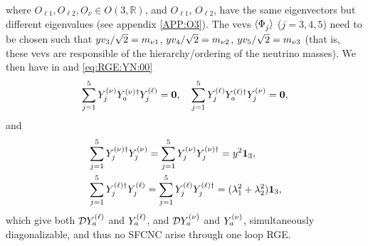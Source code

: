 \documentclass[12pt,a4paper]{article}
\begin{document}
where $O_{\ell 1},O_{\ell 2},O_\nu\in O(3,\mathbb{R})$, and $O_{\ell 1}$, $O_{\ell 2}$, have the same eigenvectors but different eigenvalues (see appendix \ref{APP:O3}).
The vevs $\VEV{\SD{j}}$ ($j=3,4,5$) need to be chosen such that $yv_{3}/\sqrt{2}=m_{\nu 1}$, $yv_{4}/\sqrt{2}=m_{\nu 2}$, $yv_{5}/\sqrt{2}=m_{\nu 3}$ (that is, these vevs are responsible of the hierarchy/ordering of the neutrino masses). We then have in  and \eqref{eq:RGE:YN:00}
\begin{equation}
 \sum_{j=1}^5Y_{j}^{\rm (\nu)}Y_{a}^{\rm (\nu)\dagger}Y_{j}^{\rm (\ell)}=\mathbf{0},\quad \sum_{j=1}^5Y_{j}^{\rm (\ell)}Y_{a}^{\rm (\ell)\dagger}Y_{j}^{\rm (\nu)}=\mathbf{0},
\end{equation}
and
\begin{equation}
\begin{aligned}
 &\sum_{j=1}^5Y_{j}^{\rm (\nu)\dagger}Y_{j}^{\rm (\nu)}=\sum_{j=1}^5Y_{j}^{\rm (\nu)}Y_{j}^{\rm (\nu)\dagger}=y^2\mathbf{1}_3,\\
 &\sum_{j=1}^5Y_{j}^{\rm (\ell)\dagger}Y_{j}^{\rm (\ell)}=\sum_{j=1}^5Y_{j}^{\rm (\ell)}Y_{j}^{\rm (\ell)\dagger}=(\lambda_1^2+\lambda_2^2)\mathbf{1}_{3},
\end{aligned}
\end{equation}
which give both $\mathcal DY_{a}^{\rm (\ell)}$ and $Y_{a}^{\rm (\ell)}$, and $\mathcal DY_{a}^{\rm (\nu)}$ and $Y_{a}^{\rm (\nu)}$, simultaneously diagonalizable, and thus no SFCNC arise through one loop RGE.

\end{document}
